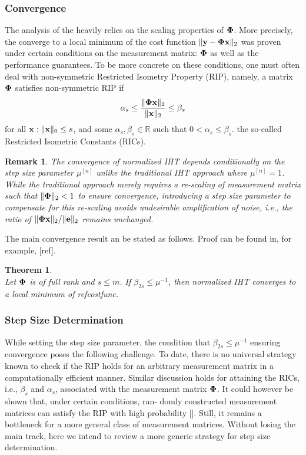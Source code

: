 \documentclass{article}
\newtheorem{theorem}{Theorem}
\newtheorem{remark}{Remark}
\begin{document}
\subsubsection{Convergence} 
The analysis of the heavily relies on the scaling properties of ${\bf \Phi}$. More precisely, the converge to a local minimum of the cost function $\|{\bf y}-{\bf \Phi x} \|_2$ was proven under certain conditions on the measurement matrix: ${\bf \Phi}$ as well as the performance guarantees. To be more concrete on these conditions, one must often deal with non-symmetric Restricted Isometry Property (RIP), namely, a matrix ${\bf \Phi}$ satisfies non-symmetric RIP if
\begin{equation}\label{rip}
\alpha_{s} \leq \frac{\|{\bf \Phi} {\bf x}\|_2}{\|{\bf x}\|_2} \leq \beta_{s}
\end{equation}
for all ${\bf x}: \|{\bf x}\|_0 \leq s$, and some $\alpha_s, \beta_s \in \mathbb{R}$ such that $0<\alpha_s\leq \beta_s$. the so-called Restricted Isometric Constants (RICs).
\begin{remark}
The convergence of normalized IHT depends conditionally on the step size parameter $\mu^{[n]}$ unlike the traditional IHT approach where $\mu^{[n]}=1$. While the traditional approach merely requires a re-scaling of measurement matrix such that $\|{\bf \Phi}\|_2 <1$ to ensure convergence, introducing a step size parameter to compensate for this re-scaling avoids undesirable amplification of noise, i.e., the ratio of $\|{\bf \Phi x}\|_2/\|{\bf e}\|_2$ remains unchanged. 
\end{remark}

The main convergence result an be stated as follows. Proof can be found in, for example, [ref].

\begin{theorem}
{\rm{\cite{niht}}}\\ 
Let ${\bf \Phi}$ is of full rank and $s\leq m$. If $\beta_{2s}\leq\mu^{-1}$, then normalized IHT converges to a local minimum of ref{costfunc}.
\end{theorem}

\subsubsection{Step Size Determination} 
While setting the step size parameter, the condition that $\beta_{2s}\leq\mu^{-1}$ ensuring convergence poses the following challenge. To date, there is no universal strategy known to check if the RIP holds for an arbitrary measurement matrix in a computationally efficient manner. Similar discussion holds for attaining the RICs, i.e., ${\beta_s}$ and $\alpha_s$, associated with the measurement matrix ${\bf \Phi}$. It could however be shown that, under certain conditions, ran-
domly constructed measurement matrices can satisfy
the RIP with high probability []. Still, it remains a bottleneck for a more general class of
measurement matrices. Without losing the main track, here we intend to review a more generic strategy for step size determination.
\end{document}
